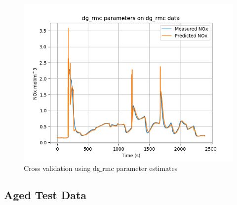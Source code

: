 \begin{figure}[H]
\begin{minipage}{0.33\textwidth}
                \includegraphics[width = \textwidth]{./figs/figs_new_mdl/dg_rmc_dg_rmc.png}
        \end{minipage}
        \caption{Cross validation using dg$\_$rmc parameter estimates}
\end{figure}


\subsection{Aged Test Data}

